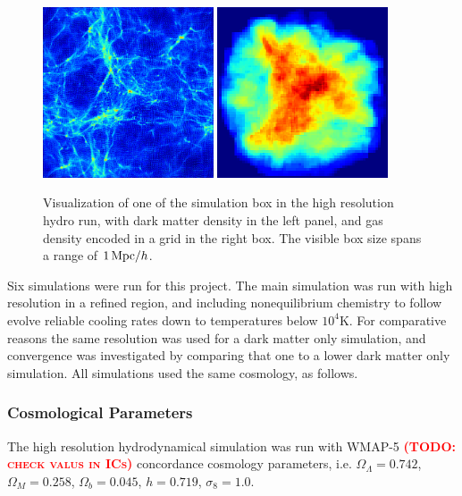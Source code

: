 \documentclass[useAMS,usenatbib]{mn2e}
\newcommand{\TODO}[1]{\textsc{\textbf{\textcolor{red}{(TODO: #1)}}}}
\begin{document}
\begin{figure}
  \begin{center}
    \includegraphics[width=0.45\textwidth]{fig/vis_dm.eps}
    \includegraphics[width=0.45\textwidth]{fig/vis_gas.eps}
  \end{center}
  \caption{\label{fig:vis} Visualization of one of the simulation box
    in the high resolution hydro run, with dark matter density in the
    left panel, and gas density encoded in a grid in the right
    box. The visible box size spans a range of $1\,{\rm Mpc}/h$.}
\end{figure}

Six simulations were run for this project. The main simulation was run
with high resolution in a refined region, and including nonequilibrium
chemistry to follow evolve reliable cooling rates down to temperatures
below $10^4$K. For comparative reasons the same resolution was used
for a dark matter only simulation, and convergence was investigated by
comparing that one to a lower dark matter only simulation. All
simulations used the same cosmology, as follows.

\subsubsection{Cosmological Parameters}
The high resolution hydrodynamical simulation was run with WMAP-5 \TODO{check valus in ICs}
concordance cosmology parameters, i.e. $\Omega_\Lambda=0.742$,
$\Omega_M=0.258$, $\Omega_b=0.045$, $h=0.719$, $\sigma_8=1.0$.
\end{document}
